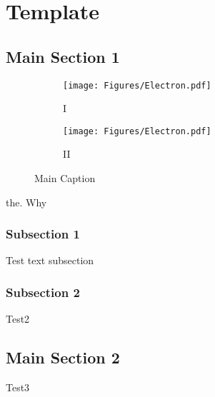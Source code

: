 \documentclass[../main.tex]{subfiles}
\begin{document}
\chapter{Template}
\label{Chapter8} %
\section{Main Section 1}

\begin{figure}
\centering
    \begin{subfigure}[t]{.3\columnwidth}
      \texttt{[image: Figures/Electron.pdf]}
      \caption{I\label{fig:ta}}
    \end{subfigure}
    \begin{subfigure}[t]{.3\columnwidth}
      \texttt{[image: Figures/Electron.pdf]}
      \caption{II\label{fig:tb}}
    \end{subfigure}
    \caption{Main Caption}
    \label{fig:tc}
\end{figure}

the. Why

\subsection{Subsection 1}

Test text subsection


\subsection{Subsection 2}
Test2


\section{Main Section 2}
Test3
\end{document}
